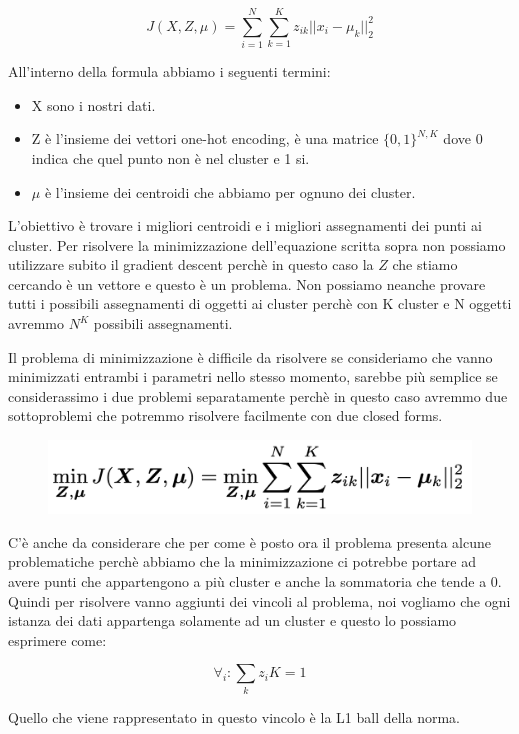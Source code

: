 \documentclass[14pt]{extreport}
\begin{document}
$$J(X,Z,\mu) = \sum_{i=1}^N \sum_{k=1}^K z_{ik}||x_i - \mu_k||_2^2$$

All'interno della formula abbiamo i seguenti termini:
\begin{itemize}
\item X sono i nostri dati.
\item Z è l'insieme dei vettori one-hot encoding, è una matrice $\{0,1\}^{N,K}$ dove 0 indica che quel punto non è nel cluster e 1 si.
\item $\mu$ è l'insieme dei centroidi che abbiamo per ognuno dei cluster.
\end{itemize}

L'obiettivo è trovare i migliori centroidi e i migliori assegnamenti dei punti ai cluster.
Per risolvere la minimizzazione dell'equazione scritta sopra non possiamo utilizzare subito il gradient descent perchè in questo caso la $Z$ che stiamo cercando 
è un vettore e questo è un problema. Non possiamo neanche provare tutti i possibili assegnamenti di oggetti ai cluster perchè con K cluster e N oggetti avremmo
$N^K$ possibili assegnamenti.

Il problema di minimizzazione è difficile da risolvere se consideriamo che vanno minimizzati entrambi i parametri nello stesso momento, sarebbe più semplice 
se considerassimo i due problemi separatamente perchè in questo caso avremmo due sottoproblemi che potremmo risolvere facilmente con due closed forms.

\begin{figure}[H] 
\centering
\includegraphics[width=0.7\linewidth]{537.jpeg}
\end{figure}

C'è anche da considerare che per come è posto ora il problema presenta alcune problematiche perchè abbiamo che la minimizzazione ci potrebbe portare ad 
avere punti che appartengono a più cluster e anche la sommatoria che tende a 0.
Quindi per risolvere vanno aggiunti dei vincoli al problema, noi vogliamo che ogni istanza dei dati appartenga solamente ad un cluster e questo lo possiamo esprimere 
come:

$$\forall_i : \sum_k z_i K = 1$$

Quello che viene rappresentato in questo vincolo è la L1 ball della norma.
\end{document}
